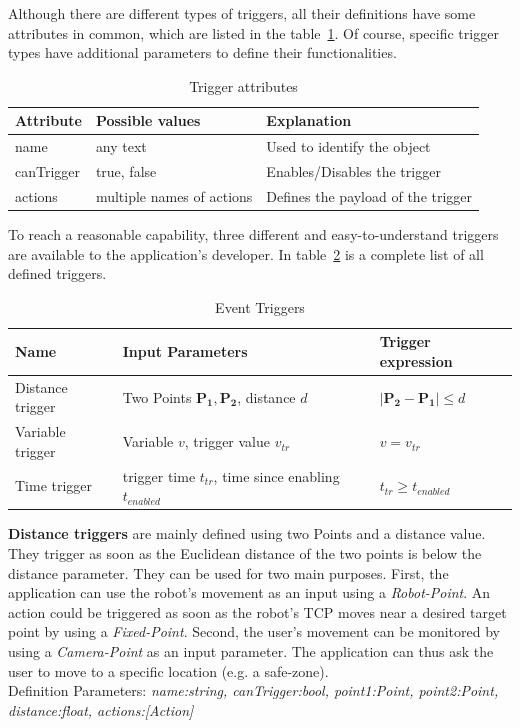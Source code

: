 Although there are different types of triggers, all their definitions have some attributes in common, which are listed in the table~\ref{Table:TriggerAttributes}. Of course, specific trigger types have additional parameters to define their functionalities.

 \begin{table}[!h]
 	\caption{Trigger attributes}
 	\label{Table:TriggerAttributes}
 	\centering
 	\begin{tabular}{lll}
 		\toprule
 		Attribute & Possible values		& Explanation	\\		
 		\midrule
 		name & any text & Used to identify the object \\
 		canTrigger & true, false		& Enables/Disables the trigger \\
 		actions & multiple names of actions & Defines the payload of the trigger \\
 		\bottomrule
 	\end{tabular}
 \end{table}

To reach a reasonable capability, three different and easy-to-understand triggers are available to the application's developer. In table~\ref{Table:Triggers} is a complete list of all defined triggers.

 
 \begin{table}
 	\caption{Event Triggers}
 	\label{Table:Triggers}
 	\centering
 	\begin{tabular}{lll}
 		\toprule
 		Name & Input Parameters		& Trigger expression	\\		
 		\midrule
 		Distance trigger & Two Points $\boldsymbol{P_1}, \boldsymbol{P_2}$, distance $d$		&  $|\boldsymbol{P_2}-\boldsymbol{P_1}| \le d$ \\
		Variable trigger & Variable $v$, trigger value $v_{tr}$ 		& $v = v_{tr}$	 \\
		Time trigger & trigger time $t_{tr}$, time since enabling $t_{enabled}$ & $t_{tr} \geq t_{enabled}$\\
		\bottomrule
	\end{tabular}
\end{table}

\textbf{Distance triggers} are mainly defined using two Points and a distance value. They trigger as soon as the Euclidean distance of the two points is below the distance parameter. They can be used for two main purposes. First, the application can use the robot's movement as an input using a \textit{Robot-Point}. An action could be triggered as soon as the robot's TCP moves near a desired target point by using a \textit{Fixed-Point}. Second, the user's movement can be monitored by using a \textit{Camera-Point} as an input parameter. The application can thus ask the user to move to a specific location (e.g. a safe-zone).\\Definition Parameters: \textit{name:string, canTrigger:bool, point1:Point, point2:Point, distance:float, actions:[Action] }

